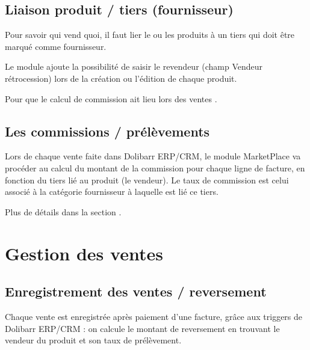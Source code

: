 \documentclass[letterpaper,10pt,english]{sphinxmanual}
\begin{document}


\section{Liaison produit / tiers (fournisseur)}
\label{\detokenize{usage:liaison-produit-tiers-fournisseur}}
Pour savoir qui vend quoi, il faut lier le ou les produits à un tiers qui doit être marqué comme fournisseur.

Le module ajoute la possibilité de saisir le revendeur (champ Vendeur rétrocession) lors de la création ou l'édition de chaque produit.


Pour que le calcul de commission ait lieu lors des ventes .


\section{Les commissions / prélèvements}
\label{\detokenize{usage:les-commissions-prelevements}}
Lors de chaque vente faite dans Dolibarr ERP/CRM, le module MarketPlace va procéder au calcul du montant de la commission pour chaque ligne de facture, en fonction du tiers lié au produit (le vendeur).
Le taux de commission est celui associé à la catégorie fournisseur à laquelle est lié ce tiers.

Plus de détails dans la section {\hyperref[\detokenize{ventes:rst-sales}]{}}.


\chapter{Gestion des ventes}
\label{\detokenize{ventes:gestion-des-ventes}}\label{\detokenize{ventes::doc}}\label{\detokenize{ventes:rst-sales}}

\section{Enregistrement des ventes / reversement}
\label{\detokenize{ventes:enregistrement-des-ventes-reversement}}
Chaque vente est enregistrée après paiement d'une facture, grâce aux triggers de Dolibarr ERP/CRM : on calcule le montant de reversement en trouvant le vendeur du produit et son taux de prélèvement.
\end{document}
